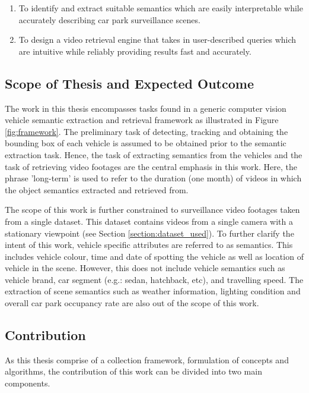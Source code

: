 \begin{enumerate}  
\item To identify and extract suitable semantics which are easily interpretable while accurately describing car park surveillance scenes.
\item To design a video retrieval engine that takes in user-described queries which are intuitive while reliably providing results fast and accurately. 
\end{enumerate}

\subsection{Scope of Thesis and Expected Outcome}
\label{subsec:scope}
The work in this thesis encompasses tasks found in a generic computer vision vehicle semantic extraction and retrieval framework as illustrated in Figure \ref{fig:framework}. The preliminary task of detecting, tracking and obtaining the bounding box of each vehicle is assumed to be obtained prior to the semantic extraction task. Hence, the task of extracting semantics from the vehicles and the task of retrieving video footages are the central emphasis in this work. Here, the phrase 'long-term' is used to refer to the duration (one month) of videos in which the object semantics extracted and retrieved from. 

The scope of this work is further constrained to surveillance video footages taken from a single dataset. This dataset contains videos from a single camera with a stationary viewpoint (see Section \ref{section:dataset_used}). To further clarify the intent of this work, vehicle specific attributes are referred to as semantics. This includes vehicle colour, time and date of spotting the vehicle as well as location of vehicle in the scene. However, this does not include vehicle semantics such as vehicle brand, car segment (e.g.: sedan, hatchback, etc), and travelling speed. The extraction of scene semantics such as weather information, lighting condition and overall car park occupancy rate are also out of the scope of this work.



\subsection{Contribution}
As this thesis comprise of a collection framework, formulation of concepts and algorithms, the contribution of this work can be divided into two main components. 

